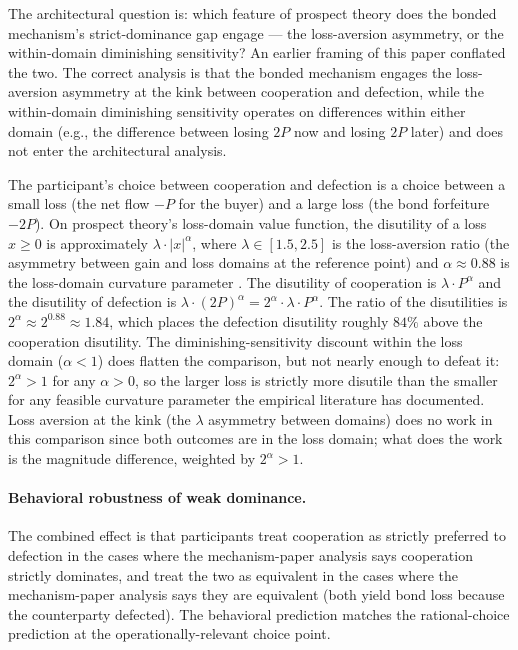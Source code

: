 \documentclass[11pt,a4paper]{article}
\theoremstyle{definition}
\theoremstyle{remark}
\newcommand{\pay}{P}
\begin{document}
The architectural question is: which feature of prospect theory
does the bonded mechanism's strict-dominance gap engage --- the
loss-aversion asymmetry, or the within-domain diminishing
sensitivity? An earlier framing of this paper conflated the two.
The correct analysis is that the bonded mechanism engages the
loss-aversion asymmetry at the kink between cooperation and
defection, while the within-domain diminishing sensitivity
operates on differences within either domain (e.g., the
difference between losing $2\pay$ now and losing $2\pay$ later)
and does not enter the architectural analysis.

The participant's choice between cooperation and defection is a
choice between a small loss (the net flow $-\pay$ for the buyer)
and a large loss (the bond forfeiture $-2\pay$). On prospect
theory's loss-domain value function, the disutility of a loss
$x \geq 0$ is approximately $\lambda \cdot |x|^{\alpha}$, where
$\lambda \in [1.5, 2.5]$ is the loss-aversion ratio (the asymmetry
between gain and loss domains at the reference point) and
$\alpha \approx 0.88$ is the loss-domain curvature parameter
\citep{tversky_kahneman_1992}. The disutility of cooperation
is $\lambda \cdot \pay^{\alpha}$ and the disutility of defection
is $\lambda \cdot (2\pay)^{\alpha} = 2^{\alpha} \cdot \lambda
\cdot \pay^{\alpha}$. The ratio of the disutilities is
$2^{\alpha} \approx 2^{0.88} \approx 1.84$, which places the
defection disutility roughly $84\%$ above the cooperation
disutility. The diminishing-sensitivity discount within the loss
domain ($\alpha < 1$) does flatten the comparison, but not
nearly enough to defeat it: $2^{\alpha} > 1$ for any
$\alpha > 0$, so the larger loss is strictly more disutile than
the smaller for any feasible curvature parameter the empirical
literature has documented. Loss aversion at the kink (the
$\lambda$ asymmetry between domains) does no work in this
comparison since both outcomes are in the loss domain; what does
the work is the magnitude difference, weighted by
$2^{\alpha} > 1$.

\paragraph{Behavioral robustness of weak dominance.}
The combined effect is that participants treat cooperation as
strictly preferred to defection in the cases where the
mechanism-paper analysis says cooperation strictly dominates,
and treat the two as equivalent in the cases where the
mechanism-paper analysis says they are equivalent (both yield
bond loss because the counterparty defected). The behavioral
prediction matches the rational-choice prediction at the
operationally-relevant choice point.
\end{document}
